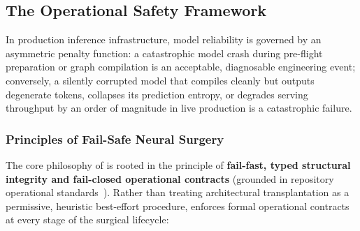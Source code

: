 \subsection{The Operational Safety Framework}
\label{sec:safety_framework}

In production inference infrastructure, model reliability is governed by an asymmetric penalty function: a catastrophic model crash during pre-flight preparation or graph compilation is an acceptable, diagnosable engineering event; conversely, a silently corrupted model that compiles cleanly but outputs degenerate tokens, collapses its prediction entropy, or degrades serving throughput by an order of magnitude in live production is a catastrophic failure.

\subsubsection{Principles of Fail-Safe Neural Surgery}
\label{sec:failsafe_principles}

The core philosophy of \neuralops{} is rooted in the principle of \textbf{fail-fast, typed structural integrity and fail-closed operational contracts} (grounded in repository operational standards~\cite{neuralops_results_hf}). Rather than treating architectural transplantation as a permissive, heuristic best-effort procedure, \neuralops{} enforces formal operational contracts at every stage of the surgical lifecycle:

